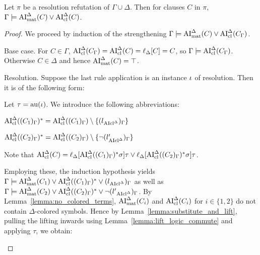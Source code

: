\documentclass[,%
	draft=false,%
	numbers=noendperiod
	11pt,
	a4paper,
	oneside,%
	openany,
]{memoir}
\begin{document}
\begin{lemma}
	\label{lemma:gamma_entails_aide}
	Let $\pi$ be a resolution refutation of $\Gamma\cup\Delta$.
	Then for clauses $C$ in\nolinebreak{} $\pi$,
	$\Gamma\entails\nolinebreak \AImatde(C) \lor\nolinebreak \AIclde(C)$.
\end{lemma}
\begin{proof}
	We proceed by induction of the strengthening $\Gamma\models \operatorname{AI}_\mathrm{mat}^\Delta(C) \lor \operatorname{AI}_\mathrm{cl}^\Delta(C_\Gamma)$\footnotemark.

	\begin{description}
		\item{Base case.}
			For $C\in \Gamma$, $\operatorname{AI}_\mathrm{cl}^\Delta(C_\Gamma) = \operatorname{AI}_\mathrm{cl}^\Delta(C) = \ell_{\Delta}[C] = C$, so $\Gamma \models \operatorname{AI}_\mathrm{cl}^\Delta(C_\Gamma)$.
			Otherwise $C \in \Delta$ and hence $\operatorname{AI}_\mathrm{mat}^\Delta(C) = \top$.

		\item{Resolution.}
			Suppose the last rule application is an instance $\iota$ of resolution. Then it is of the following form:
			\begin{prooftree}
			\end{prooftree}

			Let
			$\tau = \operatorname{au}(\iota)$.
			We introduce the following abbreviations:

			\newcommand{\clauseOnePrime}{\AIclausede((C_1)_\Gamma)^*}
			\newcommand{\clauseTwoPrime}{\AIclausede((C_2)_\Gamma)^*}


			$ \clauseOnePrime = \AIclausede((C_1)_\Gamma) \setminus \{{(l{\fromclausede})_\Gamma}\}$

			$ \clauseTwoPrime = \AIclausede((C_2)_\Gamma)\setminus \{{\lnot (l{\fromclausede'})_\Gamma}\}$

			Note that $\AIclde(C) = \lifdeltanovar{ \clauseOnePrime\sigma} \tau \lor \lifdeltanovar{ \clauseTwoPrime\sigma} \tau$.

			Employing these, the induction hypothesis yields
			$\Gamma \entails \AImatrixde(C_1) \lor \clauseOnePrime \lor {(l{\fromclausede})_\Gamma}$
			as well as
			$\Gamma \entails \AImatrixde(C_2) \lor \clauseTwoPrime \lor {\lnot (l'{\fromclausede})_\Gamma}$.
			By Lemma~\ref{lemma:no_colored_terms}, $\operatorname{AI}_\mathrm{mat}^\Delta(C_i)$ and $\operatorname{AI}_\mathrm{cl}^\Delta(C_i)$ for $i\in\{1,2\}$ do not contain $\Delta$-colored symbols.
			Hence by Lemma~\ref{lemma:substitute_and_lift}, pulling the lifting inwards using Lemma~\ref{lemma:lift_logic_commute} and applying $\tau$, we obtain:


\end{description}
\end{proof}
\end{document}
